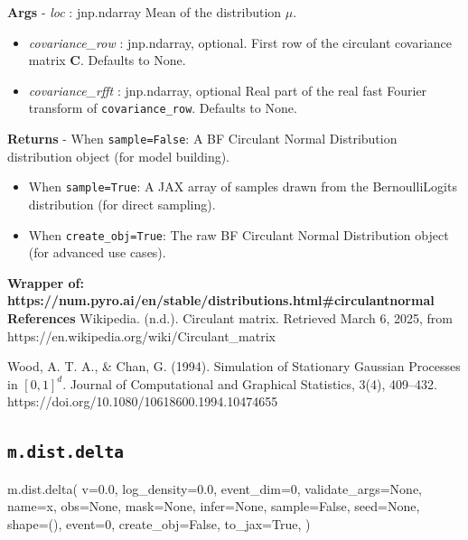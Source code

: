 \documentclass[
  letterpaper,
  DIV=11,
  numbers=noendperiod]{scrartcl}
\newenvironment{Shaded}{\begin{snugshade}}{\end{snugshade}}
\newcommand{\DecValTok}[1]{\textcolor[rgb]{0.68,0.00,0.00}{#1}}
\newcommand{\FloatTok}[1]{\textcolor[rgb]{0.68,0.00,0.00}{#1}}
\newcommand{\NormalTok}[1]{\textcolor[rgb]{0.00,0.23,0.31}{#1}}
\newcommand{\OperatorTok}[1]{\textcolor[rgb]{0.37,0.37,0.37}{#1}}
\newcommand{\StringTok}[1]{\textcolor[rgb]{0.13,0.47,0.30}{#1}}
\newcommand{\VariableTok}[1]{\textcolor[rgb]{0.07,0.07,0.07}{#1}}
\begin{document}
\textbf{Args} - \emph{loc} : jnp.ndarray Mean of the distribution
\(\mu\).

\begin{itemize}
\item
  \emph{covariance\_row} : jnp.ndarray, optional. First row of the
  circulant covariance matrix \(\mathbf{C}\). Defaults to None.
\item
  \emph{covariance\_rfft} : jnp.ndarray, optional Real part of the real
  fast Fourier transform of \texttt{covariance\_row}. Defaults to None.
\end{itemize}

\textbf{Returns} - When \texttt{sample=False}: A BF Circulant Normal
Distribution distribution object (for model building).

\begin{itemize}
\item
  When \texttt{sample=True}: A JAX array of samples drawn from the
  BernoulliLogits distribution (for direct sampling).
\item
  When \texttt{create\_obj=True}: The raw BF Circulant Normal
  Distribution object (for advanced use cases).
\end{itemize}

\textbf{Wrapper of:
https://num.pyro.ai/en/stable/distributions.html\#circulantnormal}
\textbf{References} Wikipedia. (n.d.). Circulant matrix. Retrieved March
6, 2025, from https://en.wikipedia.org/wiki/Circulant\_matrix

Wood, A. T. A., \& Chan, G. (1994). Simulation of Stationary Gaussian
Processes in \([0,1]^d\). Journal of Computational and Graphical
Statistics, 3(4), 409--432.
https://doi.org/10.1080/10618600.1994.10474655

\subsection{\texorpdfstring{\texttt{m.dist.delta}}{m.dist.delta}}\label{delta}

\begin{Shaded}
\begin{Highlighting}[]
\NormalTok{m.dist.delta(}
\NormalTok{    v}\OperatorTok{=}\FloatTok{0.0}\NormalTok{,}
\NormalTok{    log\_density}\OperatorTok{=}\FloatTok{0.0}\NormalTok{,}
\NormalTok{    event\_dim}\OperatorTok{=}\DecValTok{0}\NormalTok{,}
\NormalTok{    validate\_args}\OperatorTok{=}\VariableTok{None}\NormalTok{,}
\NormalTok{    name}\OperatorTok{=}\StringTok{\textquotesingle{}x\textquotesingle{}}\NormalTok{,}
\NormalTok{    obs}\OperatorTok{=}\VariableTok{None}\NormalTok{,}
\NormalTok{    mask}\OperatorTok{=}\VariableTok{None}\NormalTok{,}
\NormalTok{    infer}\OperatorTok{=}\VariableTok{None}\NormalTok{,}
\NormalTok{    sample}\OperatorTok{=}\VariableTok{False}\NormalTok{,}
\NormalTok{    seed}\OperatorTok{=}\VariableTok{None}\NormalTok{,}
\NormalTok{    shape}\OperatorTok{=}\NormalTok{(),}
\NormalTok{    event}\OperatorTok{=}\DecValTok{0}\NormalTok{,}
\NormalTok{    create\_obj}\OperatorTok{=}\VariableTok{False}\NormalTok{,}
\NormalTok{    to\_jax}\OperatorTok{=}\VariableTok{True}\NormalTok{,}
\NormalTok{)}
\end{Highlighting}
\end{Shaded}
\end{document}
